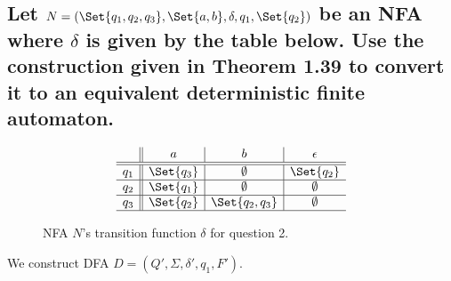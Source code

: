 \documentclass{article}
\begin{document}

\subsection{Let $N = (\Set{q_1,q_2,q_3}, \Set{a,b}, \delta, q_1, \Set{q_2})$ be an NFA where $\delta$ is given by the table below.  Use the construction given in Theorem 1.39 to convert it to an equivalent deterministic finite automaton.}

\begin{figure}[H]
\centering

\[
\begin{array}{c||c|c|c}
         & a & b & \epsilon \\ \hline \hline 
        q_1 & \Set{q_3} & \emptyset & \Set{q_2} \\ \hline 
        q_2 & \Set{q_1} & \emptyset & \emptyset \\ \hline 
        q_3 & \Set{q_2} & \Set{q_2,q_3} & \emptyset \\ \hline 
\end{array}
\]

\caption{NFA $N$'s transition function $\delta$ for question 2.}
\label{fig:mylabel}
\end{figure}

We construct DFA $D = (Q', \Sigma, \delta', q_1, F')$.  
\end{document}
